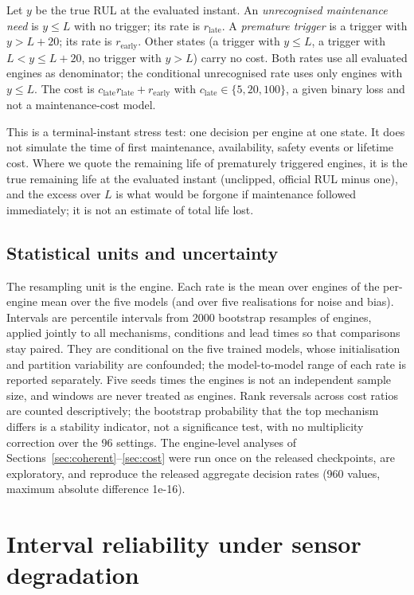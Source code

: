 \documentclass[11pt,a4paper]{article}
\newcommand{\JAgreeN}{960}
\newcommand{\JAgreeMax}{1e-16}
\begin{document}
Let $y$ be the true RUL at the evaluated instant. An \emph{unrecognised maintenance need} is $y\le L$ with no trigger; its rate is $r_{\mathrm{late}}$. A \emph{premature trigger} is a trigger with $y>L+20$; its rate is $r_{\mathrm{early}}$. Other states (a trigger with $y\le L$, a trigger with $L<y\le L+20$, no trigger with $y>L$) carry no cost. Both rates use all evaluated engines as denominator; the conditional unrecognised rate uses only engines with $y\le L$. The cost is $c_{\mathrm{late}}r_{\mathrm{late}}+r_{\mathrm{early}}$ with $c_{\mathrm{late}}\in\{5,20,100\}$, a given binary loss and not a maintenance-cost model.

This is a terminal-instant stress test: one decision per engine at one state. It does not simulate the time of first maintenance, availability, safety events or lifetime cost. Where we quote the remaining life of prematurely triggered engines, it is the true remaining life at the evaluated instant (unclipped, official RUL minus one), and the excess over $L$ is what would be forgone if maintenance followed immediately; it is not an estimate of total life lost.

\subsection{Statistical units and uncertainty}
The resampling unit is the engine. Each rate is the mean over engines of the per-engine mean over the five models (and over five realisations for noise and bias). Intervals are percentile intervals from 2000 bootstrap resamples of engines, applied jointly to all mechanisms, conditions and lead times so that comparisons stay paired. They are conditional on the five trained models, whose initialisation and partition variability are confounded; the model-to-model range of each rate is reported separately. Five seeds times the engines is not an independent sample size, and windows are never treated as engines. Rank reversals across cost ratios are counted descriptively; the bootstrap probability that the top mechanism differs is a stability indicator, not a significance test, with no multiplicity correction over the 96 settings. The engine-level analyses of Sections~\ref{sec:coherent}--\ref{sec:cost} were run once on the released checkpoints, are exploratory, and reproduce the released aggregate decision rates (\JAgreeN{} values, maximum absolute difference \JAgreeMax).

\section{Interval reliability under sensor degradation}\label{sec:reliability}
\end{document}

